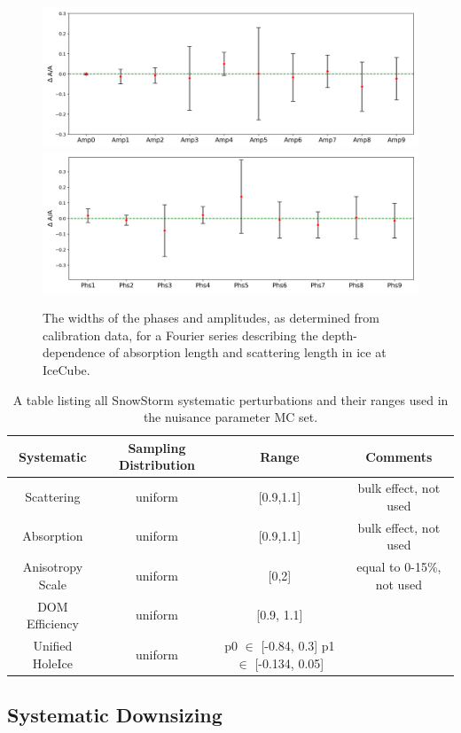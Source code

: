 \documentclass[main.tex]{subfiles}
\begin{document}
\begin{figure}
    \centering
    \includegraphics[width=0.7\linewidth]{figures/ice_amplitudes.png}
    \includegraphics[width=0.7\linewidth]{figures/ice_phases.png}
    \caption{The widths of the phases and amplitudes, as determined from calibration data, for a Fourier series describing the depth-dependence of absorption length and scattering length in ice at IceCube.}\label{fig:ice_param_widths}
\end{figure}

\begin{table}
    \centering
    \begin{tabular}{c | ccc}\rowcolor{blue!25}
        Systematic & Sampling Distribution & Range & Comments \\\hline
        Scattering & uniform & [0.9,1.1] & bulk effect, not used\\
        Absorption & uniform & [0.9,1.1] & bulk effect, not used\\
        Anisotropy Scale & uniform & [0,2] & equal to 0-15\%, not used \\
        DOM Efficiency & uniform & [0.9, 1.1] &  \\
        Unified HoleIce & uniform & \shortstack{p0 $\in$ [-0.84, 0.3] \\ p1 $\in$ [-0.134, 0.05]} & 
    \end{tabular}
    \caption{A table listing all SnowStorm systematic perturbations and their ranges used in the nuisance parameter MC set.}\label{table:snowstorm2}
\end{table}

\subsection{Systematic Downsizing}\label{sect:down}
\end{document}
